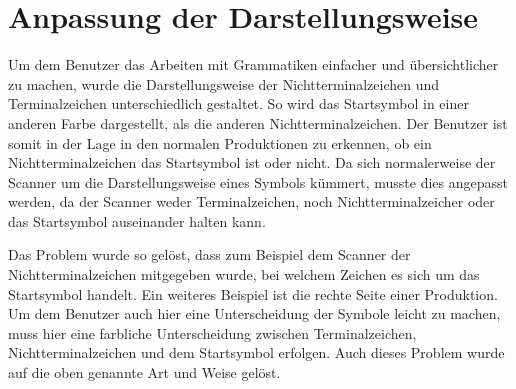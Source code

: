 \section{Anpassung der Darstellungsweise}

Um dem Benutzer das Arbeiten mit Grammatiken einfacher und übersichtlicher zu
machen, wurde die Darstellungsweise der Nichtterminalzeichen und
Terminalzeichen unterschiedlich gestaltet. So wird das Startsymbol in einer
anderen Farbe dargestellt, als die anderen Nichtterminalzeichen. Der Benutzer
ist somit in der Lage in den normalen Produktionen zu erkennen, ob ein
Nichtterminalzeichen das Startsymbol ist oder nicht. Da sich normalerweise der
Scanner um die Darstellungsweise eines Symbols kümmert, musste dies angepasst
werden, da der Scanner weder Terminalzeichen, noch Nichtterminalzeicher oder
das Startsymbol auseinander halten kann.\vspace{10pt}

Das Problem wurde so gelöst, dass zum Beispiel dem Scanner der
Nichtterminalzeichen mitgegeben wurde, bei welchem Zeichen es sich um das
Startsymbol handelt. Ein weiteres Beispiel ist die rechte Seite einer
Produktion. Um dem Benutzer auch hier eine Unterscheidung der Symbole leicht zu
machen, muss hier eine farbliche Unterscheidung zwischen Terminalzeichen,
Nichtterminalzeichen und dem Startsymbol erfolgen. Auch dieses Problem wurde auf
die oben genannte Art und Weise gelöst.\vspace{10pt}
